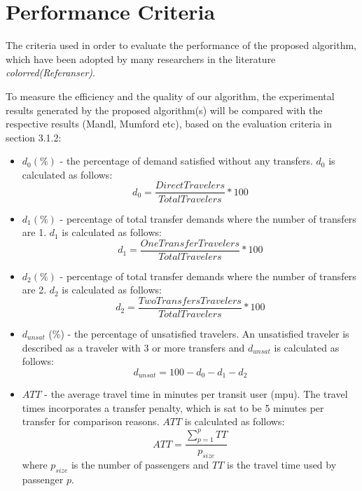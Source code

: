 \section{Performance Criteria}
\label{sec:performanceCriteria}

The criteria used in order to evaluate the performance of the proposed algorithm, which have been adopted by many researchers in the literature \emph{color{red}(Referanser)}.

To measure the efficiency and the quality of our algorithm, the experimental results generated by the proposed algorithm(s) will be compared with the respective results (Mandl, Mumford etc), based on the evaluation criteria in section 3.1.2: 

\begin{itemize}
\item $d_0 (\%)$ - the percentage of demand satisfied without any transfers. $d_0$ is calculated as follows:
$$ d_0 = \frac{DirectTravelers}{TotalTravelers}*100$$
\item $d_1 (\%)$ - percentage of total transfer demands where the number of transfers are 1. $d_1$ is calculated as follows:
$$ d_1 = \frac{OneTransferTravelers}{TotalTravelers}*100$$
\item $d_2 (\%)$ - percentage of total transfer demands where the number of transfers are 2. $d_2$ is calculated as follows:
$$ d_2 = \frac{TwoTransfersTravelers}{TotalTravelers}*100$$
\item $d_{unsat}$ (\%) - the percentage of unsatisfied travelers. An unsatisfied traveler is described as a traveler with 3 or more transfers and $d_{unsat}$ is calculated as follows:
$$ d_{unsat} = 100 - d_0 - d_1 - d_2$$
\item $ATT$  - the average travel time in minutes per transit user (mpu). The travel times incorporates a transfer penalty, which is sat to be 5 minutes per transfer for comparison reasons. $ATT$ is calculated as follows:
$$ATT = \frac{\sum\limits^{p}_{p=1}TT}{p_{size}}$$
where $p_{size}$ is the number of passengers and $TT$ is the travel time used by passenger $p$. 
\end{itemize}

